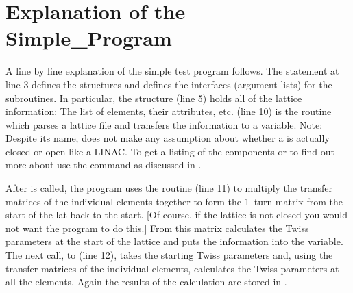 \section{Explanation of the Simple_Program}

A line by line explanation of the simple test program follows. 
The  statement at line 3
defines the \bmad structures and defines the interfaces
(argument lists) for the \bmad subroutines. In particular, the
 structure (line 5) holds all of the lattice
information: The list of elements, their attributes,
etc.  (line 10) is the routine which parses a lattice
file and transfers the information to a
 variable. Note: Despite its name, \bmad does
not make any assumption about whether a  is actually
closed or open like a LINAC. To get a listing of the 
components or to find out more about  use the 
command as discussed in .

After  is called, the program uses the
routine  (line 11) to multiply the transfer
matrices of the individual elements together to form the 1--turn
matrix from the start of the lat back to the start. [Of course,
if the lattice is not closed you would not want the program to do
this.] From this matrix
 calculates the Twiss parameters at the start of
the lattice and puts the information into the  variable. The
next call, to  (line 12), takes the starting
Twiss parameters and, using the transfer matrices of the individual
elements, calculates the Twiss parameters at all the elements. Again
the results of the calculation are stored in . 

